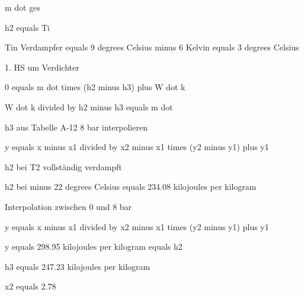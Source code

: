 m dot ges

h2 equals Ti

Tin Verdampfer equals 9 degrees Celsius minus 6 Kelvin equals 3 degrees Celsius

1. HS um Verdichter

0 equals m dot times (h2 minus h3) plus W dot k

W dot k divided by h2 minus h3 equals m dot

h3 aus Tabelle A-12 8 bar interpolieren

y equals x minus x1 divided by x2 minus x1 times (y2 minus y1) plus y1

h2 bei T2 vollständig verdampft

h2 bei minus 22 degrees Celsius equals 234.08 kilojoules per kilogram

Interpolation zwischen 0 und 8 bar

y equals x minus x1 divided by x2 minus x1 times (y2 minus y1) plus y1

y equals 298.95 kilojoules per kilogram equals h2

h3 equals 247.23 kilojoules per kilogram

x2 equals 2.78